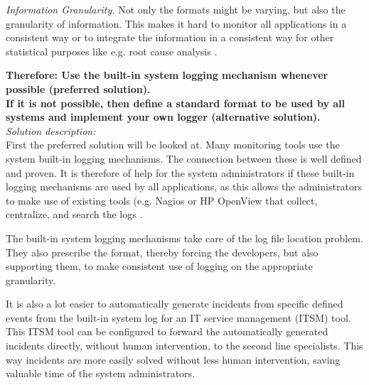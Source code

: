 \textit{Information Granularity.} Not only the formats might be varying, but also the granularity of information. This makes it hard to monitor all applications in a consistent way or to integrate the information in a consistent way for other statistical purposes like e.g. root cause analysis \cite{conf/mkwi/PaschkeS06}.

\begin{center}
   
\end{center}

\textbf{Therefore:
Use the built-in system logging mechanism whenever possible (preferred solution).\\
If it is not possible, then define a standard format to be used by all systems 
and implement your own logger (alternative solution).}\\

\textit{Solution description:}\\
First the preferred solution will be looked at. Many monitoring tools use the system built-in logging mechanisms. The connection between these is well defined and proven. It is therefore of help for the system administrators if these built-in logging mechanisms are used by all applications, as this allows the administrators to make use of existing tools (e.g. Nagios \cite{Nagios}
 or HP OpenView \cite{OpenView}
 that collect, centralize, and search the logs \cite{Limoncelli2011a}.

The built-in system logging mechanisms take care of the log file location problem. They also prescribe the format, thereby forcing the developers, but also supporting them, to make consistent use of logging on the appropriate granularity.

It is also a lot easier to automatically generate incidents from specific defined events from the built-in system log for an IT service management (ITSM) tool. This ITSM tool can be configured to forward the automatically generated incidents directly, without human intervention, to the second line specialists. This way incidents are more easily solved without less human intervention, saving valuable time of the system administrators.

